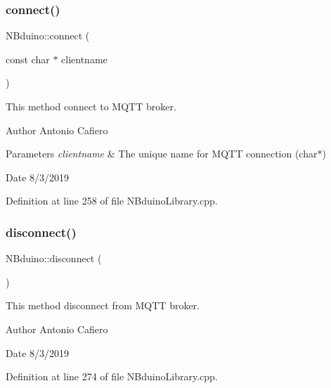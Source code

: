 \subsubsection{\texorpdfstring{connect()}{connect()}}
{\footnotesize\ttfamily N\+Bduino\+::connect (\begin{DoxyParamCaption}\item[{const char $\ast$}]{clientname }\end{DoxyParamCaption})}

This method connect to M\+Q\+TT broker. \begin{DoxyAuthor}{Author}
Antonio Cafiero 
\end{DoxyAuthor}

\begin{DoxyParams}{Parameters}
{\em clientname} & The unique name for M\+Q\+TT connection (char$\ast$) \\
\hline
\end{DoxyParams}
\begin{DoxyDate}{Date}
8/3/2019 
\end{DoxyDate}


Definition at line 258 of file N\+Bduino\+Library.\+cpp.

\mbox{\label{class_n_bduino_ae013d9c6d18771efa34f9805039a0127}} 
\subsubsection{\texorpdfstring{disconnect()}{disconnect()}}
{\footnotesize\ttfamily N\+Bduino\+::disconnect (\begin{DoxyParamCaption}{ }\end{DoxyParamCaption})}

This method disconnect from M\+Q\+TT broker. \begin{DoxyAuthor}{Author}
Antonio Cafiero 
\end{DoxyAuthor}
\begin{DoxyDate}{Date}
8/3/2019 
\end{DoxyDate}


Definition at line 274 of file N\+Bduino\+Library.\+cpp.

\mbox{\label{class_n_bduino_a3179d72e8766be6bd07892ddd4ad6be1}} 
